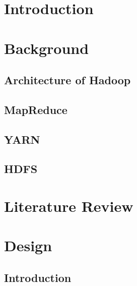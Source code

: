 \documentclass[print,ms]{nuthesis}%
\begin{document}
\newpage
\begin{acknowledgments}
\label{sec:ack}

\par 

\end{acknowledgments}

\tableofcontents
\newpage
\listoffigures
\listoftables

\mainmatter
\chapter{Introduction}



\chapter{Background}

\section{Architecture of Hadoop}

\section{MapReduce}


\section{YARN}

\section{HDFS}



\chapter{Literature Review}


\newpage
\chapter{Design}
\section{Introduction}
\end{document}
